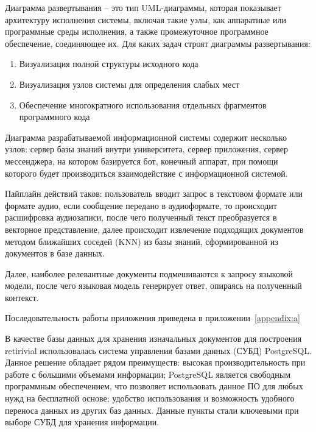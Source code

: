 Диаграмма развертывания – это тип UML-диаграммы, которая показывает архитектуру
исполнения системы, включая такие узлы, как аппаратные или программные среды
исполнения, а также промежуточное программное обеспечение, соединяющее их. 
Для каких задач строят диаграммы развертывания:

\begin{enumerate}
    \item Визуализация полной структуры исходного кода
    \item Визуализация узлов системы для определения слабых мест
    \item Обеспечение многократного использования отдельных фрагментов
        программного кода
\end{enumerate}

Диаграмма разрабатываемой информационной системы содержит несколько узлов: 
сервер базы знаний внутри университета, сервер приложения, сервер мессенджера,
на котором базируется бот, конечный аппарат, при помощи которого будет 
производиться взаимодействие с информационной системой.




Пайплайн действий таков: пользователь вводит запрос в текстовом формате или 
формате аудио, если сообщение передано в аудиоформате, то происходит 
расшифровка аудиозаписи, после чего полученный текст преобразуется в векторное
представление, далее происходит извлечение подходящих документов методом
ближайших соседей (KNN) из базы знаний, сформированной из документов в базе 
данных.

Далее, наиболее релевантные документы подмешиваются к запросу языковой модели,
после чего языковая модель генерирует ответ, опираясь на полученный контекст.

Последовательность работы приложения приведена в приложении~\ref{appendix:a} 


В качестве базы данных для хранения изначальных документов для построения 
retirivial использовалась система управления базами данных (СУБД) PostgreSQL\@.
Данное решение обладает рядом преимуществ: высокая производительность при 
работе с большими объемами информации; PostgreSQL является свободным 
программным обеспечением, что позволяет использовать данное ПО для любых 
нужд на бесплатной основе; удобство использования и возможность удобного 
переноса данных из других баз данных. Данные пункты стали ключевыми при выборе 
СУБД для хранения информации. 

